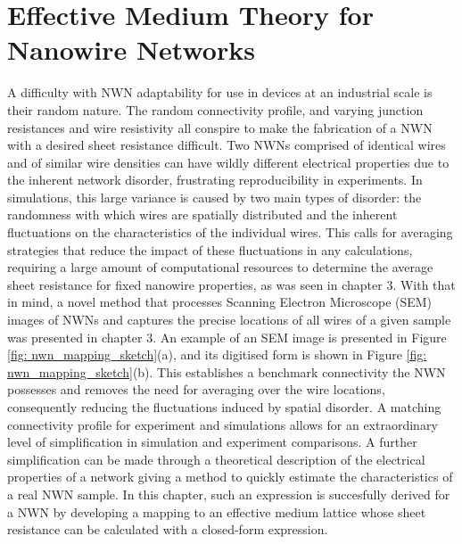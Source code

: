 \chapter{Effective Medium Theory for Nanowire Networks}

A difficulty with NWN adaptability for use in devices at an industrial scale is their random nature. The random connectivity profile, and varying junction resistances and wire resistivity all conspire to make the fabrication of a NWN with a desired sheet resistance difficult. Two NWNs comprised of identical wires and of similar wire densities can have wildly different electrical properties due to the inherent network disorder, frustrating reproducibility in experiments. In simulations, this large variance is caused by two main types of disorder: the randomness with which wires are spatially distributed\cite{ kallmes1960, sampson2008} and the inherent fluctuations on the characteristics of the individual wires. This calls for averaging strategies that reduce the impact of these fluctuations in any calculations, requiring a large amount of computational resources to determine the average sheet resistance for fixed nanowire properties, as was seen in chapter 3. With that in mind, a novel method that processes Scanning Electron Microscope (SEM) images of NWNs and captures the precise locations of all wires of a given sample was presented in chapter 3. An example of an SEM image is presented in Figure \ref{fig: nwn_mapping_sketch}(a), and its digitised form is shown in Figure \ref{fig: nwn_mapping_sketch}(b). This establishes a benchmark connectivity the NWN possesses and removes the need for averaging over the wire locations, consequently reducing the fluctuations induced by spatial disorder. A matching connectivity profile for experiment and simulations allows for an extraordinary level of simplification in simulation and experiment comparisons. A further simplification can be made through a theoretical description of the electrical properties of a network giving a method to quickly estimate the characteristics of a real NWN sample. In this chapter, such an expression is succesfully derived for a NWN by developing a mapping to an effective medium lattice whose sheet resistance can be calculated with a closed-form expression\cite{ocallaco2016}.


